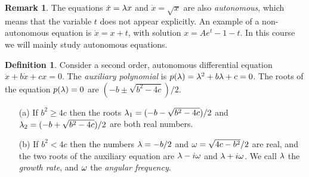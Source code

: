 \documentclass[reqno]{amsart}
\theoremstyle{definition}
\newtheorem{remark}[theorem]{Remark}
\newtheorem{definition}[theorem]{Definition}
\begin{document}
\begin{remark}
 The equations $\dot{x}=\lambda x$ and $\dot{x}=\sqrt{x}$ are also
 \emph{autonomous}, which means that the variable $t$ does not appear
 explicitly.  An example of a non-autonomous equation is
 $\dot{x}=x+t$, with solution $x=Ae^t-1-t$.  In this course we will
 mainly study autonomous equations.
\end{remark}

\begin{definition}
 Consider a second order, autonomous differential equation
 $\ddot{x}+b\dot{x}+cx=0$.  The \emph{auxiliary polynomial} is
 $p(\lambda)=\lambda^2+b\lambda+c=0$.  The roots of the equation $p(\lambda)=0$ are
 $(-b\pm\sqrt{b^2-4c})/2$. 
 \begin{itemize}
  \item[(a)] If $b^2\geq 4c$ then the roots
   $\lambda_1=(-b-\sqrt{b^2-4c})/2$ and $\lambda_2=(-b+\sqrt{b^2-4c})/2$ are
   both real numbers.
  \item[(b)] If $b^2<4c$ then the numbers $\lambda=-b/2$ and
   $\omega=\sqrt{4c-b^2}/2$ are real, and the two roots of the auxiliary
   equation are $\lambda-i\omega$ and $\lambda+i\omega$.  We call $\lambda$ the
   \emph{growth rate}, and $\omega$ the \emph{angular frequency}.
 \end{itemize}
\end{definition}
\end{document}
